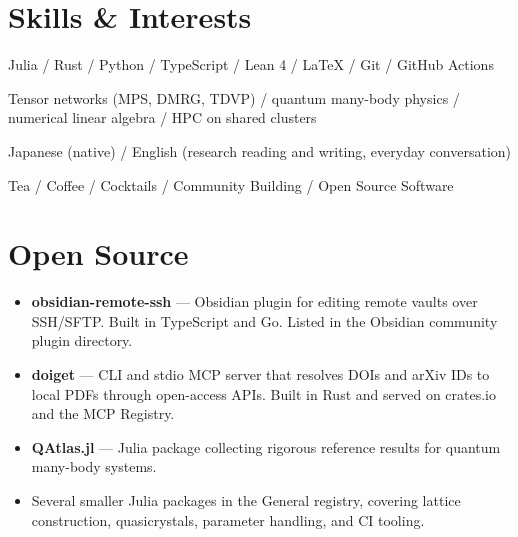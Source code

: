 \documentclass[11pt]{article} %
\begin{document}
\section{Skills \& Interests}
\begin{description}[itemsep=0pt]
	\item[Technical] Julia / Rust / Python / TypeScript / Lean 4 / \LaTeX{} / Git / GitHub Actions
	\item[Research] Tensor networks (MPS, DMRG, TDVP) / quantum many-body physics / numerical linear algebra / HPC on shared clusters
	\item[Language] Japanese (native) / English (research reading and writing, everyday conversation)
	\item[Interests] Tea / Coffee / Cocktails / Community Building / Open Source Software
\end{description}

\section{Open Source}
\begin{itemize}
	\item {\bfseries obsidian-remote-ssh} --- Obsidian plugin for editing remote vaults over SSH/SFTP. Built in TypeScript and Go. Listed in the Obsidian community plugin directory.
	\item {\bfseries doiget} --- CLI and stdio MCP server that resolves DOIs and arXiv IDs to local PDFs through open-access APIs. Built in Rust and served on crates.io and the MCP Registry.
	\item {\bfseries QAtlas.jl} --- Julia package collecting rigorous reference results for quantum many-body systems.
	\item Several smaller Julia packages in the General registry, covering lattice construction, quasicrystals, parameter handling, and CI tooling.
\end{itemize}
\end{document}
